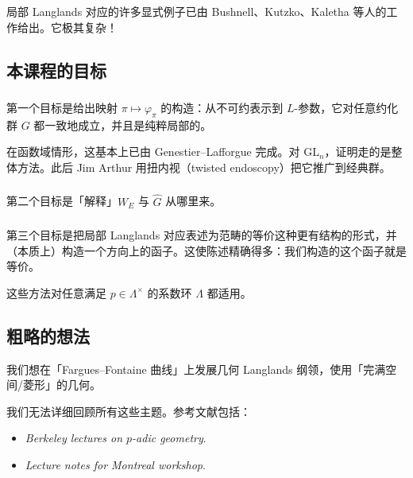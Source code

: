 \begin{remark}
局部 Langlands 对应的许多显式例子已由 Bushnell、Kutzko、Kaletha 等人的工作给出。它极其复杂！
\end{remark}

\subsection{本课程的目标}


\subsubsection{}

第一个目标是给出映射 $\pi\mapsto\varphi_\pi$ 的构造：从不可约表示到 $L$-参数，它对任意约化群 $G$ 都一致地成立，并且是纯粹局部的。

\begin{remark}[相关工作]
在函数域情形，这基本上已由 Genestier--Lafforgue 完成。对 $\mathrm{GL}_n$，证明走的是整体方法。此后 Jim Arthur 用扭内视（twisted endoscopy）把它推广到经典群。
\end{remark}

\subsubsection{}

第二个目标是「解释」$W_E$ 与 $\widehat{G}$ 从哪里来。

\subsubsection{}

第三个目标是把局部 Langlands 对应表述为范畴的等价这种更有结构的形式，并（本质上）构造一个方向上的函子。这使陈述精确得多：我们构造的这个函子就是等价。

\begin{remark}[系数]
这些方法对任意满足 $p\in\Lambda^\times$ 的系数环 $\Lambda$ 都适用。
\end{remark}

\subsection{粗略的想法}

我们想在「Fargues--Fontaine 曲线」上发展几何 Langlands 纲领，使用「完满空间/菱形」的几何。

我们无法详细回顾所有这些主题。参考文献包括：
\begin{itemize}
  \item \emph{Berkeley lectures on $p$-adic geometry}.
  \item \emph{Lecture notes for Montreal workshop}.
\end{itemize}

